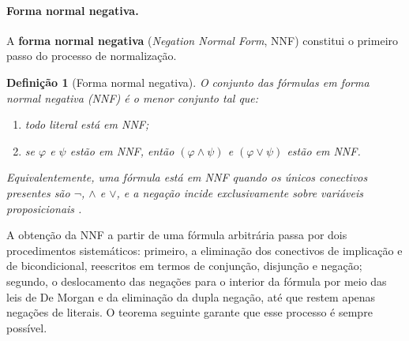 \documentclass[12pt,a4paper,oneside]{report}
\theoremstyle{tituloplain}
\theoremstyle{titulodef}
\newtheorem{definicao}[teorema]{Definição}
\begin{document}
\paragraph{Forma normal negativa.} A \textbf{forma normal negativa} (\textit{Negation Normal Form}, NNF) constitui o primeiro passo do processo de normalização.

\begin{definicao}[Forma normal negativa]\label{def:nnf}
O conjunto das fórmulas em \emph{forma normal negativa} (NNF) é o menor conjunto tal que:
\begin{enumerate}
  \item todo literal está em NNF;
  \item se $\varphi$ e $\psi$ estão em NNF, então $(\varphi\wedge\psi)$ e $(\varphi\vee\psi)$ estão em NNF.
\end{enumerate}
Equivalentemente, uma fórmula está em NNF quando os únicos conectivos presentes são $\neg$, $\wedge$ e $\vee$, e a negação incide exclusivamente sobre variáveis proposicionais \cite{walicki2011}.
\end{definicao}

A obtenção da NNF a partir de uma fórmula arbitrária passa por dois procedimentos sistemáticos: primeiro, a eliminação dos conectivos de implicação e de bicondicional, reescritos em termos de conjunção, disjunção e negação; segundo, o deslocamento das negações para o interior da fórmula por meio das leis de De Morgan e da eliminação da dupla negação, até que restem apenas negações de literais. O teorema seguinte garante que esse processo é sempre possível.
\end{document}
